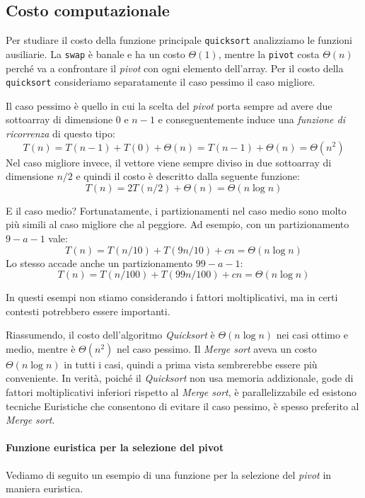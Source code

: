 \subsection{Costo computazionale}
Per studiare il costo della funzione principale \texttt{quicksort} analizziamo
le funzioni ausiliarie. La \texttt{swap} è banale e ha un costo
$\Theta(1)$, mentre la \texttt{pivot} costa $\Theta(n)$ perché va a confrontare
il \emph{pivot} con ogni elemento dell'array. Per il costo della
\texttt{quicksort} consideriamo separatamente il caso pessimo il caso migliore.

\bigskip\noindent
Il caso pessimo è quello in cui la scelta del \emph{pivot} porta sempre ad avere
due sottoarray di dimensione $0$ e $n-1$ e conseguentemente induce una
\emph{funzione di ricorrenza} di questo tipo:
\[T(n)=T(n-1)+T(0)+\Theta(n)=T(n-1)+\Theta(n)=\Theta(n^2)\]
Nel caso migliore invece, il vettore viene sempre diviso in due sottoarray di
dimensione $n/2$ e quindi il costo è descritto dalla seguente funzione:
\[T(n)=2T(n/2)+\Theta(n)=\Theta(n\log n)\]

\bigskip\noindent
E il caso medio?
Fortunatamente, i partizionamenti nel caso medio sono molto più simili al caso
migliore che al peggiore. Ad esempio, con un partizionamento $9-a-1$ vale:
\[T(n)=T(n/10)+T(9n/10)+cn=\Theta(n\log n)\]
Lo stesso accade anche un partizionamento $99-a-1$:
\[T(n)=T(n/100)+T(99n/100)+cn=\Theta(n\log n)\]
\begin{note}
    In questi esempi non stiamo considerando i fattori moltiplicativi, ma in
    certi contesti potrebbero essere importanti.
\end{note}\noindent
Riassumendo, il costo dell'algoritmo \emph{Quicksort} è $\Theta(n\log n)$ nei
casi ottimo e medio, mentre è $\Theta(n^2)$ nel caso pessimo. Il \emph{Merge sort}
aveva un costo $\Theta(n\log n)$ in tutti i casi, quindi a prima vista
sembrerebbe essere più conveniente. In verità, poiché il \emph{Quicksort}
non usa memoria addizionale, gode di fattori moltiplicativi inferiori rispetto al
\emph{Merge sort}, è parallelizzabile ed esistono tecniche Euristiche che consentono
di evitare il caso pessimo, è spesso preferito al \emph{Merge sort}.

\paragraph{Funzione euristica per la selezione del pivot}
Vediamo di seguito un esempio di una funzione per la selezione del \emph{pivot}
in maniera euristica.


